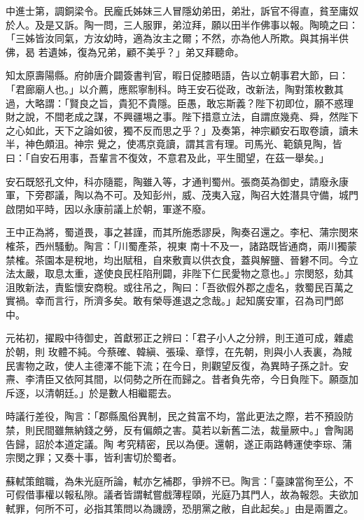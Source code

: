 \begin{pinyinscope}
 中進士第，調銅梁令。民龐氏姊妹三人冒隱幼弟田，弟壯，訴官不得直，貧至庸奴於人。及是又訴。陶一問，三人服罪，弟泣拜，願以田半作佛事以報。陶曉之曰：「三姊皆汝同氣，方汝幼時，適為汝主之爾；不然，亦為他人所欺。與其捐半供佛，曷
 若遺姊，復為兄弟，顧不美乎？」弟又拜聽命。



 知太原壽陽縣。府帥唐介闢簽書判官，暇日促膝晤語，告以立朝事君大節，曰：「君廊廟人也。」以介薦，應熙寧制科。時王安石從政，改新法，陶對策枚數其過，大略謂：「賢良之旨，貴犯不貴隱。臣愚，敢忘斯義？陛下初即位，願不惑理財之說，不間老成之謀，不興疆埸之事。陛下措意立法，自謂庶幾堯、舜，然陛下之心如此，天下之論如彼，獨不反而思之乎？」及奏第，神宗顧安石取卷讀，讀未半，神色頗沮。神宗
 覺之，使馮京竟讀，謂其言有理。司馬光、範鎮見陶，皆曰：「自安石用事，吾輩言不復效，不意君及此，平生聞望，在茲一舉矣。」



 安石既怒孔文仲，科亦隨罷，陶雖入等，才通判蜀州。張商英為御史，請廢永康軍，下旁郡議，陶以為不可。及知彭州，威、茂夷入寇，陶召大姓潛具守備，城門啟閉如平時，因以永康前議上於朝，軍遂不廢。



 王中正為將，蜀道畏，事之甚謹，而其所施悉謬戾，陶奏召還之。李杞、蒲宗閔來榷茶，西州騷動。陶言：「川蜀產茶，視東
 南十不及一，諸路既皆通商，兩川獨蒙禁榷。茶園本是稅地，均出賦租，自來敷賣以供衣食，蓋與解鹽、晉礬不同。今立法太嚴，取息太重，遂使良民枉陷刑闢，非陛下仁民愛物之意也。」宗閔怒，劾其沮敗新法，責監懷安商稅。或往吊之，陶曰：「吾欲假外郡之虛名，救蜀民百萬之實禍。幸而言行，所濟多矣。敢有榮辱進退之念哉。」起知廣安軍，召為司門郎中。



 元祐初，擢殿中待御史，首獻邪正之辨曰：「君子小人之分辨，則王道可成，雜處於朝，則
 玫體不純。今蔡確、韓縝、張璪、章惇，在先朝，則與小人表裏，為賊民害物之政，使人主德澤不能下流；在今日，則觀望反復，為異時子孫之計。安燾、李清臣又依阿其間，以伺勢之所在而歸之。昔者負先帝，今日負陛下。願亟加斥逐，以清朝廷。」於是數人相繼罷去。



 時議行差役，陶言：「郡縣風俗異制，民之貧富不均，當此更法之際，若不預設防禁，則民間雖無納錢之勞，反有偏頗之害。莫若以新舊二法，裁量厥中。」會陶謁告歸，詔於本道定議。陶
 考究精密，民以為便。還朝，遂正兩路轉運使李琮、蒲宗閔之罪；又奏十事，皆利害切於蜀者。



 蘇軾策館職，為朱光庭所論，軾亦乞補郡，爭辨不已。陶言：「臺諫當徇至公，不可假借事權以報私隙。議者皆謂軾嘗戲薄程頤，光庭乃其門人，故為報怨。夫欲加軾罪，何所不可，必指其策問以為譏謗，恐朋黨之敝，自此起矣。」由是兩置之。




\end{pinyinscope}
